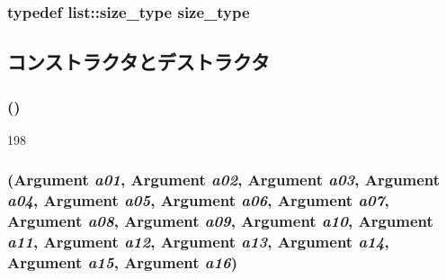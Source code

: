 \label{classVarArgs_1_1List_a21297939c7021f4ce84d850f600d957b}
\hypertarget{classVarArgs_1_1List_a1451245dcc01455eaef625ded39c247e}{
\subsubsection[{size\_\-type}]{\setlength{\rightskip}{0pt plus 5cm}typedef list::size\_\-type {\bf size\_\-type}}}
\label{classVarArgs_1_1List_a1451245dcc01455eaef625ded39c247e}


\subsection{コンストラクタとデストラクタ}
\hypertarget{classVarArgs_1_1List_a17e6c90f14225bdac5c65ed915b0a2f6}{
\subsubsection[{List}]{ ()}}
\label{classVarArgs_1_1List_a17e6c90f14225bdac5c65ed915b0a2f6}



\begin{DoxyCode}
198 {}
\end{DoxyCode}
\hypertarget{classVarArgs_1_1List_a960eeba7b73e64e05c0af517ecf765be}{
\subsubsection[{List}]{ ({\bf Argument} {\em a01}, \/  {\bf Argument} {\em a02}, \/  {\bf Argument} {\em a03}, \/  {\bf Argument} {\em a04}, \/  {\bf Argument} {\em a05}, \/  {\bf Argument} {\em a06}, \/  {\bf Argument} {\em a07}, \/  {\bf Argument} {\em a08}, \/  {\bf Argument} {\em a09}, \/  {\bf Argument} {\em a10}, \/  {\bf Argument} {\em a11}, \/  {\bf Argument} {\em a12}, \/  {\bf Argument} {\em a13}, \/  {\bf Argument} {\em a14}, \/  {\bf Argument} {\em a15}, \/  {\bf Argument} {\em a16})}}
\label{classVarArgs_1_1List_a960eeba7b73e64e05c0af517ecf765be}



